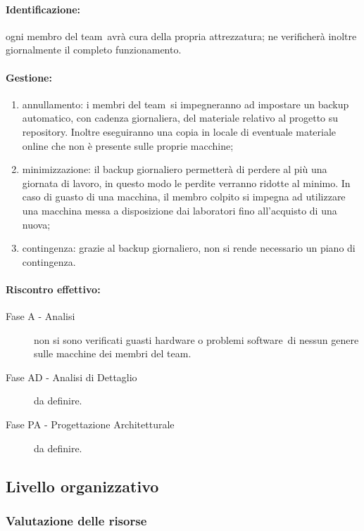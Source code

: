 \documentclass[../PianoProgetto.tex]{subfiles}
\begin{document}
	\paragraph*{Identificazione:} ogni membro del team\g\ avrà cura della propria attrezzatura; ne verificherà inoltre giornalmente il completo funzionamento.
	
	\paragraph*{Gestione:}
	\begin{enumerate}
		\item annullamento: i membri del team\g\ si impegneranno ad impostare un backup automatico, con cadenza giornaliera, del materiale relativo al progetto su repository\g . Inoltre eseguiranno una copia in locale di eventuale materiale online che non è presente sulle proprie macchine;
		\item minimizzazione: il backup giornaliero permetterà di perdere al più una giornata di lavoro, in questo modo le perdite verranno ridotte al minimo. In caso di guasto di una macchina, il membro colpito si impegna ad utilizzare una macchina messa a disposizione dai laboratori fino all'acquisto di una nuova;
		\item contingenza: grazie al backup giornaliero, non si rende necessario un piano di contingenza.
	\end{enumerate} 	
	
	\paragraph*{Riscontro effettivo:}
		\begin{description}
			\item[Fase A - Analisi] non si sono verificati guasti hardware o problemi software\g\ di nessun genere sulle macchine dei membri del team\g .
			\item[Fase AD - Analisi di Dettaglio] da definire.
			\item[Fase PA - Progettazione Architetturale] da definire.
		\end{description}

\subsection{Livello organizzativo}

\subsubsection{Valutazione delle risorse}
\end{document}
